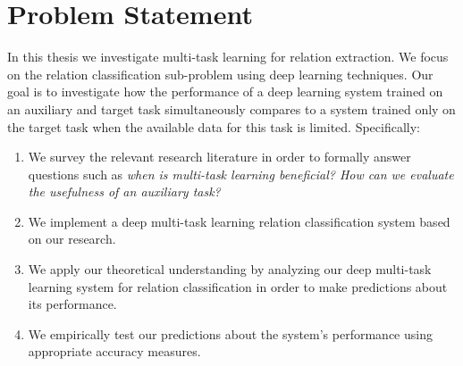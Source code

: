 \section{Problem Statement}
In this thesis we investigate multi-task learning for relation extraction. We focus on the relation classification sub-problem using deep learning techniques. Our goal is to investigate how the performance of a deep learning system trained on an auxiliary and target task simultaneously compares to a system trained only on the target task when the available data for this task is limited. Specifically:
\begin{enumerate}
	\item We survey the relevant research literature in order to formally answer questions such as \textit{when is multi-task learning beneficial? How can we evaluate the usefulness of an auxiliary task?}
	\item We implement a deep multi-task learning relation classification system based on our research.
	\item We apply our theoretical understanding by analyzing our deep multi-task learning system for relation classification in order to make predictions about its performance.
	\item We empirically test our predictions about the system's performance using appropriate accuracy measures.
\end{enumerate}